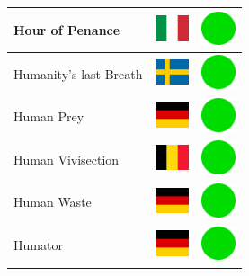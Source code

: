 \documentclass[12pt, a4paper, twoside]{report}
\begin{document}
\begin{center}
\begin{longtable}{|p{5cm}|p{2cm}|p{2cm}|}
 Hour of Penance                                            & \includegraphics[width=1cm]{../4x3/it} &   \includegraphics[width=1cm]{../likes/y} \\ \hline
 Humanity's last Breath                                     & \includegraphics[width=1cm]{../4x3/se} &   \includegraphics[width=1cm]{../likes/y} \\ \hline
 Human Prey                                                 & \includegraphics[width=1cm]{../4x3/de} &   \includegraphics[width=1cm]{../likes/y} \\ \hline
 Human Vivisection                                          & \includegraphics[width=1cm]{../4x3/be} &   \includegraphics[width=1cm]{../likes/y} \\ \hline
 Human Waste                                                & \includegraphics[width=1cm]{../4x3/de} &   \includegraphics[width=1cm]{../likes/y} \\ \hline
 Humator                                                    & \includegraphics[width=1cm]{../4x3/de} &   \includegraphics[width=1cm]{../likes/y} \\ \hline

\end{longtable}
\end{center}
\end{document}
